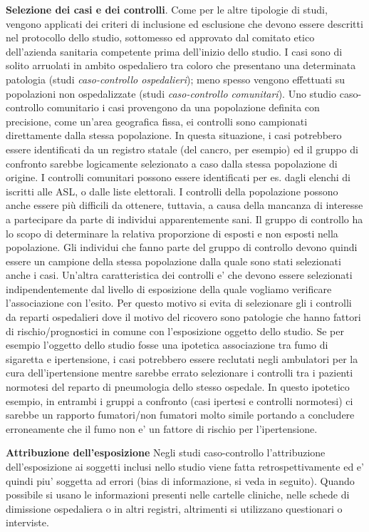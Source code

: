 \documentclass[]{book}
\begin{document}
\textbf{Selezione dei casi e dei controlli}.
Come per le altre tipologie di studi, vengono applicati dei criteri di inclusione ed esclusione che devono essere descritti nel protocollo dello studio, sottomesso ed approvato dal comitato etico dell'azienda sanitaria competente prima dell'inizio dello studio. I casi sono di solito arruolati in ambito ospedaliero tra coloro che presentano una determinata patologia (studi \emph{caso-controllo ospedalieri}); meno spesso vengono effettuati su popolazioni non ospedalizzate (studi \emph{caso-controllo comunitari}).
Uno studio caso-controllo comunitario i casi provengono da una popolazione definita con precisione, come un'area geografica fissa, ei controlli sono campionati direttamente dalla stessa popolazione. In questa situazione, i casi potrebbero essere identificati da un registro statale (del cancro, per esempio) ed il gruppo di confronto sarebbe logicamente selezionato a caso dalla stessa popolazione di origine. I controlli comunitari possono essere identificati per es. dagli elenchi di iscritti alle ASL, o dalle liste elettorali. I controlli della popolazione possono anche essere più difficili da ottenere, tuttavia, a causa della mancanza di interesse a partecipare da parte di individui apparentemente sani.
Il gruppo di controllo ha lo scopo di determinare la relativa proporzione di esposti e non esposti nella popolazione. Gli individui che fanno parte del gruppo di controllo devono quindi essere un campione della stessa popolazione dalla quale sono stati selezionati anche i casi.
Un'altra caratteristica dei controlli e' che devono essere selezionati indipendentemente dal livello di esposizione della quale vogliamo verificare l'associazione con l'esito. Per questo motivo si evita di selezionare gli i controlli da reparti ospedalieri dove il motivo del ricovero sono patologie che hanno fattori di rischio/prognostici in comune con l'esposizione oggetto dello studio. Se per esempio l'oggetto dello studio fosse una ipotetica associazione tra fumo di sigaretta e ipertensione, i casi potrebbero essere reclutati negli ambulatori per la cura dell'ipertensione mentre sarebbe errato selezionare i controlli tra i pazienti normotesi del reparto di pneumologia dello stesso ospedale. In questo ipotetico esempio, in entrambi i gruppi a confronto (casi ipertesi e controlli normotesi) ci sarebbe un rapporto fumatori/non fumatori molto simile portando a concludere erroneamente che il fumo non e' un fattore di rischio per l'ipertensione.

\textbf{Attribuzione dell'esposizione}
Negli studi caso-controllo l'attribuzione dell'esposizione ai soggetti inclusi nello studio viene fatta retrospettivamente ed e' quindi piu' soggetta ad errori (bias di informazione, si veda in seguito). Quando possibile si usano le informazioni presenti nelle cartelle cliniche, nelle schede di dimissione ospedaliera o in altri registri, altrimenti si utilizzano questionari o interviste.
\end{document}
